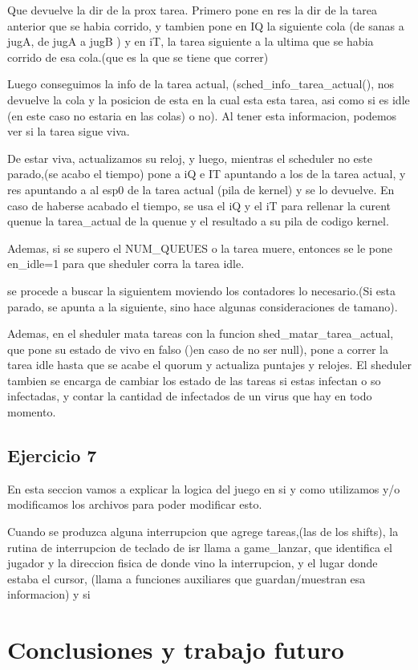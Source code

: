 \documentclass[a4paper]{article}
\begin{document}
Que devuelve la dir de la prox tarea. Primero pone en res la dir de la tarea anterior que se habia corrido, y tambien pone en IQ la siguiente cola (de sanas a jugA, de jugA a jugB ) y en iT, la tarea siguiente a la ultima que se habia corrido de esa cola.(que es la que se tiene que correr)

Luego conseguimos la info de la tarea actual, (sched_info_tarea_actual(), nos devuelve la cola y la posicion de esta en la cual esta esta tarea, asi como si es idle (en este caso no estaria en las colas) o no). Al tener esta informacion, podemos ver si la tarea sigue viva.

De estar viva, actualizamos su reloj, y luego, mientras el scheduler no este parado,(se acabo el tiempo) pone a iQ  e IT apuntando a los de la tarea actual, y res apuntando a al esp0 de la tarea actual (pila de kernel) y se lo devuelve. En caso de haberse acabado el tiempo, se usa el iQ y el iT para rellenar la curent quenue la tarea_actual de la quenue y el resultado a su pila de codigo kernel.

Ademas, si se supero el NUM_QUEUES o la tarea muere, entonces se le pone en_idle=1 para que sheduler corra la tarea idle.


 se procede a buscar la siguientem moviendo los contadores lo necesario.(Si esta parado, se apunta a la siguiente, sino hace algunas consideraciones de tamano).
 
Ademas, en el sheduler mata tareas con la funcion shed_matar_tarea_actual, que pone su estado de vivo en falso ()en caso de no ser null), pone a correr la tarea idle hasta que se acabe el quorum y actualiza puntajes y relojes. 
El sheduler tambien se encarga de cambiar los estado de las tareas si estas infectan o so infectadas, y contar la cantidad de infectados de un virus que hay en todo momento.
   

\subsection{Ejercicio 7}


En esta seccion vamos a explicar la logica del juego en si y como utilizamos y/o modificamos los archivos para poder modificar esto.


Cuando se produzca alguna interrupcion que agrege tareas,(las de los shifts), 
la rutina de interrupcion de teclado de isr llama a game_lanzar, que identifica el jugador y la direccion fisica de donde vino la interrupcion, y el lugar donde estaba el cursor, (llama a funciones auxiliares que  guardan/muestran esa informacion) y si 



\section{Conclusiones y trabajo futuro}
\end{document}

